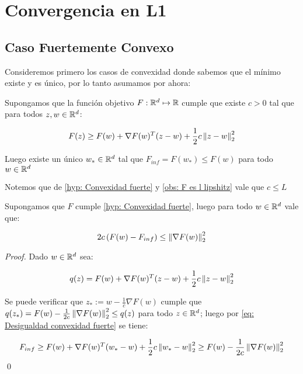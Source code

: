 \chapter{Convergencia en L1}\label{ch:convergenciaL1}

\section{Caso Fuertemente Convexo}
Consideremos primero los casos de convexidad donde sabemos que el m\'inimo existe y es \'unico, por lo tanto asumamos por ahora:

\begin{hyp}
	\label{hyp: Convexidad fuerte}
	Supongamos que la funci\'on objetivo $F : {\mathbb{R}}^d \mapsto {\mathbb{R}}$ cumple que existe $c >0$ tal que para todos $z,w \in {\mathbb{R}}^d$:
	
	\begin{equation}
		F(z) \geq F(w) + \nabla F(w)^T (z-w) + \frac{1}{2} c \left\lVert z-w\right\rVert_2^2
	\end{equation}
	
	Luego existe un \'unico $w_{*} \in {\mathbb{R}}^d$ tal que $F_{inf} = F(w_*) \leq F(w)$ para todo $w \in {\mathbb{R}}^d$
	
\end{hyp}

Notemos que de \ref{hyp: Convexidad fuerte} y \ref{obs: F es l lipshitz} vale que $c \leq L$ 

\begin{lemma}
	\label{eq: Desigualdad convexidad fuerte}
	Supongamos que $F$ cumple \ref{hyp: Convexidad fuerte}, luego para todo $w \in {\mathbb{R}}^d$ vale que:
	
	\begin{equation}
		2c\left(F(w) - F_{inf}\right) \leq \left\lVert\nabla F(w)\right\rVert_2^2
	\end{equation}
	
\end{lemma}

\begin{proof}
	Dado $w \in {\mathbb{R}}^d$ sea:
	
	\begin{equation*}
		q(z) = F(w) + \nabla F(w)^T (z-w) + \frac{1}{2} c \left\lVert z-w\right\rVert_2^2
	\end{equation*}
	
	Se puede verificar que $z_* := w - \frac{1}{c} \nabla F(w)$ cumple que $q(z_*) = F(w) - \frac{1}{2c} \left\lVert\nabla F(w)\right\rVert_2^2 \leq q(z)$ para todo $z \in {\mathbb{R}}^d$; luego por \ref{eq: Desigualdad convexidad fuerte} se tiene:
	
	\begin{equation*}
		F_{inf} \geq F(w) + \nabla F(w)^T (w_*-w) + \frac{1}{2} c \left\lVert w_*-w\right\rVert_2^2 \geq F(w) - \frac{1}{2c} \left\lVert\nabla F(w)\right\rVert_2^2 
	\end{equation*}
	\qed
\end{proof}

